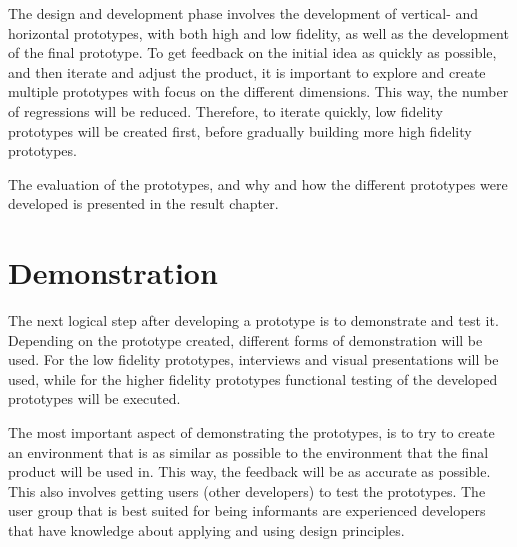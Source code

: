 \documentclass{report}
\begin{document}
The design and development phase involves the development of vertical- and horizontal prototypes, with both high and low fidelity, as well as the development of the final prototype. To get feedback on the initial idea as quickly as possible, and then iterate and adjust the product, it is important to explore and create multiple prototypes with focus on the different dimensions. This way, the number of regressions will be reduced. Therefore, to iterate quickly, low fidelity prototypes will be created first, before gradually building more high fidelity prototypes.

The evaluation of the prototypes, and why and how the different prototypes were developed is presented in the result chapter. 

\section{Demonstration}

The next logical step after developing a prototype is to demonstrate and test it. Depending on the prototype created, different forms of demonstration will be used. For the low fidelity prototypes, interviews and visual presentations will be used, while for the higher fidelity prototypes functional testing of the developed prototypes will be executed. 

The most important aspect of demonstrating the prototypes, is to try to create an environment that is as similar as possible to the environment that the final product will be used in. This way, the feedback will be as accurate as possible. This also involves getting users (other developers) to test the prototypes. The user group that is best suited for being informants are experienced developers that have knowledge about applying and using design principles.

\end{document}
